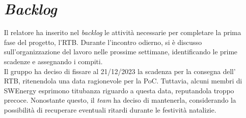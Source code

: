\section{\textit{Backlog}}

Il relatore ha inserito nel \textit{backlog} le attività necessarie per
completare la prima fase del progetto, l'RTB. Durante l'incontro odierno, si è
discusso sull'organizzazione del lavoro nelle prossime settimane,
identificando le prime scadenze e assegnando i compiti. \\
Il gruppo ha deciso di fissare al 21/12/2023 la scadenza per la consegna dell'
RTB, ritenendola una data ragionevole per la PoC. Tuttavia, alcuni membri di
SWEnergy esprimono titubanza riguardo a questa data, reputandola troppo precoce.
Nonostante questo, il \textit{team} ha deciso di mantenerla, considerando la
possibilità di recuperare eventuali ritardi durante le festività natalizie.

